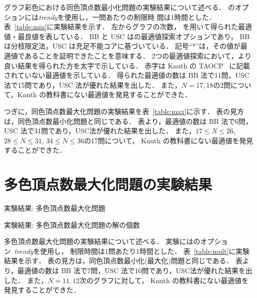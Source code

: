 グラフ彩色における同色頂点数最小化問題の実験結果について述べる．
{\clingo}のオプションには\textit{trendy}を使用し，一問あたりの制限時
間は1時間とした．
%
表~\ref{table:min}に実験結果を示す．
左からグラフの次数，
{\clingo}を用いて得られた最適値・最良値を表している．
BB と USC は{\clingo}の最適値探索オプションであり，
BB は分枝限定法，USC は充足不能コアに基づいている．
記号``*''は，その値が最適値であることを証明できたことを意味する．
2つの最適値探索において，より良い結果を得られた方を太字で示している．
赤字は Knuth の TAOCP~\cite{Knuth:TAOCP:SAT}
に記載されていない最適値を示している．
%
得られた最適値の数は BB 法で11問，USC 法で15問であり，USC 法が優れた結果を出した．
また，$N=17,18$の2問について，Knuth の教科書にない最適値を発見することができた．

つぎに，同色頂点数最大化問題の実験結果を表~\ref{table:max}に示す．
表の見方は，同色頂点数最小化問題と同じである．
表より，最適値の数は BB 法で6問，USC 法で31問であり，USC法が優れた結果を出した．
また，$17\leq N\leq 26$, $28\leq N\leq 31$, $34\leq N\leq 36$の17問について，
Knuth の教科書にない最適値を発見することができた．

\section{多色頂点数最大化問題の実験結果}

\begin{table}[htbp]
  \renewcommand{\arraystretch}{1.1}  
  \begin{minipage}[t]{0.3\linewidth}
    \centering
    \caption{実験結果: 多色頂点数最大化問題}
    \label{table:mult}
  \end{minipage}
  \begin{minipage}[t]{0.65\linewidth}
    \centering
    \caption{実験結果: 多色頂点数最大化問題の解の個数}
    \label{table:com}
  \end{minipage}
\end{table}

多色頂点数最大化問題の実験結果について述べる．
実験には{\clingo}のオプション~\textit{trendy}を使用し，
制限時間は1問あたり1時間とした．
%
表~\ref{table:mult}に実験結果を示す．
表の見方は，同色頂点数最小化(最大化)問題と同じである．
表より，最適値の数は BB 法で7問，USC 法で10問であり，USC法が優れた結果を出した．
また，$N=11,12$次のグラフに対して，
Knuth の教科書にない最適値を発見することができた．

